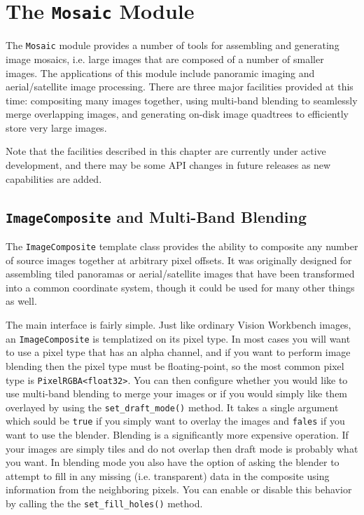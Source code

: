 \chapter{The {\tt Mosaic} Module}\label{ch:mosaic-module}

The \verb#Mosaic# module provides a number of tools for assembling and
generating image mosaics, i.e. large images that are composed of a
number of smaller images.  The applications of this module include
panoramic imaging and aerial/satellite image processing.  There are 
three major facilities provided at this time: compositing many images 
together, using multi-band blending to seamlessly merge overlapping 
images, and generating on-disk image quadtrees to efficiently store 
very large images.

Note that the facilities described in this chapter are currently under
active development, and there may be some API changes in future
releases as new capabilities are added.

\section{{\tt ImageComposite} and Multi-Band Blending}\label{sec:imagecomposite}

The \verb#ImageComposite# template class provides the ability to
composite any number of source images together at arbitrary pixel
offsets.  It was originally designed for assembling tiled panoramas or
aerial/satellite images that have been transformed into a common
coordinate system, though it could be used for many other things as
well.

The main interface is fairly simple.  Just like ordinary Vision
Workbench images, an \verb#ImageComposite# is templatized on its pixel
type.  In most cases you will want to use a pixel type that has an
alpha channel, and if you want to perform image blending then the
pixel type must be floating-point, so the most common pixel type is
\verb#PixelRGBA<float32>#.  You can then configure whether you would
like to use multi-band blending to merge your images or if you would
simply like them overlayed by using the \verb#set_draft_mode()#
method.  It takes a single argument which sould be \verb#true# if you
simply want to overlay the images and \verb#fales# if you want to use
the blender.  Blending is a significantly more expensive operation.
If your images are simply tiles and do not overlap then draft mode is
probably what you want.  In blending mode you also have the option of
asking the blender to attempt to fill in any missing
(i.e. transparent) data in the composite using information from the
neighboring pixels.  You can enable or disable this behavior by
calling the the \verb#set_fill_holes()# method.

